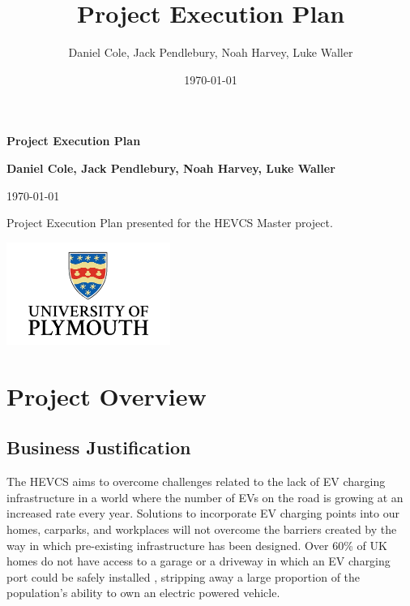 \documentclass [12pt]{article}
\title{Project Execution Plan}
\author{Daniel Cole, Jack Pendlebury, Noah Harvey, Luke Waller}
\date{\today}
\begin{document}
\begin{titlepage}
    \begin{center}
        \vspace*{1cm}

        {\Huge \textbf{Project Execution Plan}}

        \vspace{1.5cm}

        \textbf{Daniel Cole, Jack Pendlebury, Noah Harvey, Luke Waller}

        \today

        \vfill

        Project Execution Plan presented for the HEVCS Master project.

        \vspace{0.8cm}

        \includegraphics[width=0.4\textwidth]{UOP_Logo.png}

    \end{center}
\end{titlepage}

\newpage
{}
\setcounter{page}{1}
\tableofcontents
\newpage

\newpage
\section{Project Overview}\label{sec:section_1}
\subsection{Business Justification}\label{sec:business_justification}
The HEVCS aims to overcome challenges related to the lack of EV charging infrastructure in a world where the number of EVs on the road is growing at an increased rate every year. Solutions to incorporate EV charging points into our homes, carparks, and workplaces will not overcome the barriers created by the way in which pre-existing infrastructure has been designed. Over 60\% of UK homes do not have access to a garage or a driveway in which an EV charging port could be safely installed \cite{60_no_parkers}, stripping away a large proportion of the population's ability to own an electric powered vehicle.
\end{document}
